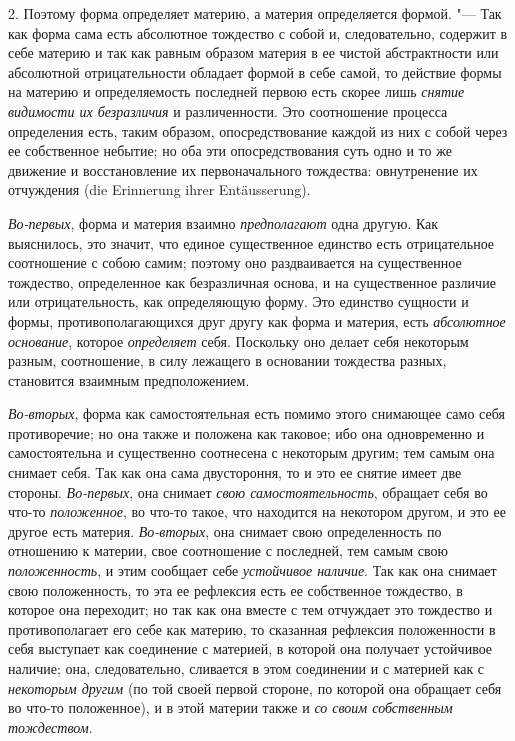 2. Поэтому форма определяет материю, а материя определяется формой. "--- Так
как форма сама есть абсолютное тождество с собой и, следовательно, содержит
в себе материю и так как равным образом материя в ее чистой абстрактности
или абсолютной отрицательности обладает формой в себе самой, то действие
формы на материю и определяемость последней первою есть скорее лишь
{\em снятие видимости их безразличия} и различенности.
Это соотношение процесса определения есть, таким образом, опосредствование
каждой из них с собой через ее собственное небытие; но оба эти
опосредствования суть одно и то же движение и восстановление их
первоначального тождества: овнутренение их отчуждения (die Erinnerung ihrer
Entäusserung).

{\em Во-первых}, форма и материя взаимно
{\em предполагают} одна другую. Как выяснилось, это
значит, что единое существенное единство есть отрицательное соотношение с
собою самим; поэтому оно раздваивается на существенное тождество,
определенное как безразличная основа, и на существенное различие или
отрицательность, как определяющую форму. Это единство сущности и формы,
противополагающихся друг другу как форма и материя, есть
{\em абсолютное основание}, которое
{\em определяет} себя. Поскольку оно делает себя
некоторым разным, соотношение, в силу лежащего в основании тождества
разных, становится взаимным предположением.

{\em Во-вторых}, форма как самостоятельная есть помимо
этого снимающее само себя противоречие; но она также и положена как
таковое; ибо она одновременно и самостоятельна и существенно соотнесена с
некоторым другим; тем самым она снимает себя. Так как она сама двустороння,
то и это ее снятие имеет две стороны. {\em Во-первых},
она снимает {\em свою самостоятельность}, обращает себя
во что-то {\em положенное}, во что-то такое, что
находится на некотором другом, и это ее другое есть материя.
{\em Во-вторых}, она снимает свою определенность по
отношению к материи, свое соотношение с последней, тем самым свою
{\em положенность}, и этим сообщает себе
{\em устойчивое наличие}. Так как она снимает свою
положенность, то эта ее рефлексия есть ее собственное тождество, в которое
она переходит; но так как она вместе с тем отчуждает это тождество и
противополагает его себе как материю, то сказанная рефлексия положенности в
себя выступает как соединение с материей, в которой она получает устойчивое
наличие; она, следовательно, сливается в этом соединении и с материей как с
{\em некоторым другим} (по той своей первой стороне, по
которой она обращает себя во что-то положенное), и в этой материи также и
{\em со своим собственным тождеством}.

